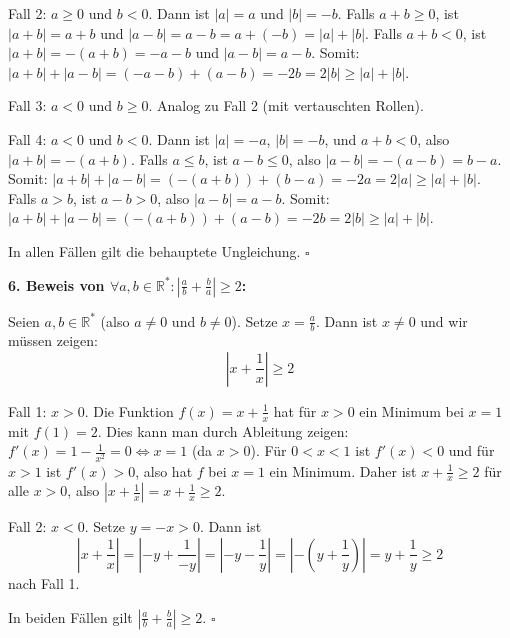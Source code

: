 \documentclass{article}
\newcommand{\abs}[1]{|#1|}
\newcommand{\R}{\mathbb{R}}
\newcommand{\fa}[1]{\forall #1 \colon}
\begin{document}
Fall 2: $a \geq 0$ und $b < 0$. Dann ist $\abs{a} = a$ und $\abs{b} = -b$.
Falls $a + b \geq 0$, ist $\abs{a + b} = a + b$ und $\abs{a - b} = a - b = a + (-b) = \abs{a} + \abs{b}$.
Falls $a + b < 0$, ist $\abs{a + b} = -(a + b) = -a - b$ und $\abs{a - b} = a - b$.
Somit: $\abs{a + b} + \abs{a - b} = (-a - b) + (a - b) = -2b = 2\abs{b} \geq \abs{a} + \abs{b}$.

Fall 3: $a < 0$ und $b \geq 0$. Analog zu Fall 2 (mit vertauschten Rollen).

Fall 4: $a < 0$ und $b < 0$. Dann ist $\abs{a} = -a$, $\abs{b} = -b$, und $a + b < 0$, also $\abs{a + b} = -(a + b)$.
Falls $a \leq b$, ist $a - b \leq 0$, also $\abs{a - b} = -(a - b) = b - a$.
Somit: $\abs{a + b} + \abs{a - b} = (-(a + b)) + (b - a) = -2a = 2\abs{a} \geq \abs{a} + \abs{b}$.
Falls $a > b$, ist $a - b > 0$, also $\abs{a - b} = a - b$.
Somit: $\abs{a + b} + \abs{a - b} = (-(a + b)) + (a - b) = -2b = 2\abs{b} \geq \abs{a} + \abs{b}$.

In allen Fällen gilt die behauptete Ungleichung. $\square$

\textbf{6. Beweis von \(\fa{a,b \in \R^*} \abs{\frac{a}{b} + \frac{b}{a}} \geq 2\):}

Seien $a, b \in \R^*$ (also $a \neq 0$ und $b \neq 0$). Setze $x = \frac{a}{b}$. Dann ist $x \neq 0$ und wir müssen zeigen:
\[\abs{x + \frac{1}{x}} \geq 2\]

Fall 1: $x > 0$. Die Funktion $f(x) = x + \frac{1}{x}$ hat für $x > 0$ ein Minimum bei $x = 1$ mit $f(1) = 2$.
Dies kann man durch Ableitung zeigen: $f'(x) = 1 - \frac{1}{x^2} = 0 \iff x = 1$ (da $x > 0$).
Für $0 < x < 1$ ist $f'(x) < 0$ und für $x > 1$ ist $f'(x) > 0$, also hat $f$ bei $x = 1$ ein Minimum.
Daher ist $x + \frac{1}{x} \geq 2$ für alle $x > 0$, also $\abs{x + \frac{1}{x}} = x + \frac{1}{x} \geq 2$.

Fall 2: $x < 0$. Setze $y = -x > 0$. Dann ist
\[\abs{x + \frac{1}{x}} = \abs{-y + \frac{1}{-y}} = \abs{-y - \frac{1}{y}} = \abs{-(y + \frac{1}{y})} = y + \frac{1}{y} \geq 2\]
nach Fall 1.

In beiden Fällen gilt $\abs{\frac{a}{b} + \frac{b}{a}} \geq 2$. $\square$
\end{document}
